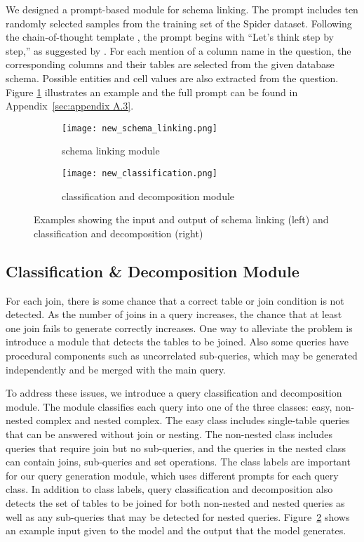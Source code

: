 We designed a prompt-based module for schema linking. The prompt includes ten randomly selected samples from the training set of the Spider dataset. Following the chain-of-thought template \citep{wei2022chain}, the prompt begins with ``Let's think step by step,'' as suggested by \citet{kojima2022large}. %
For each mention of a column name in the question, the corresponding columns and their tables are selected from the given database schema. Possible entities and cell values are also extracted from the question. Figure \ref{fig:2} illustrates an example and the full prompt can be found in Appendix~\ref{sec:appendix A.3}.

\begin{figure}
     \centering
        \begin{subfigure}[b]{0.49\textwidth}
        \centering
        \texttt{[image: new\_schema\_linking.png]}
        \caption{schema linking module}
        \label{fig:2}
        \end{subfigure}
     \hfill
        \begin{subfigure}[b]{0.5\textwidth}
        \centering
        \texttt{[image: new\_classification.png]}
        \caption{classification and decomposition module}
        \label{fig:3}
        \end{subfigure}
    \caption{Examples showing the input and output of schema linking (left) and classification and decomposition (right)}
    \label{fig:two modules}
\end{figure}

\subsection{Classification \& Decomposition Module}
For each join, there is some chance that a correct table or join condition is not detected. As the number of joins in a query increases, the chance that at least one join fails to generate correctly increases. One way to alleviate the problem is introduce a module that detects the tables to be joined. Also some queries have procedural components such as uncorrelated sub-queries, which may be generated independently and be merged with the main query.  

To address these issues, we introduce a query classification and decomposition module. The module classifies each query into one of the three classes: easy, non-nested complex and nested complex. The easy class includes single-table queries that can be answered without join or nesting. The non-nested class includes queries that require join but no sub-queries, and the queries in the nested class can contain joins, sub-queries and set operations. The class labels are important for our query generation module, which uses different prompts for each query class. In addition to class labels, query classification and decomposition also detects the set of tables to be joined for both non-nested and nested queries as well as any sub-queries that may be detected for nested queries.
Figure~\ref{fig:3} shows an example input given to the model and the output that the model generates.

